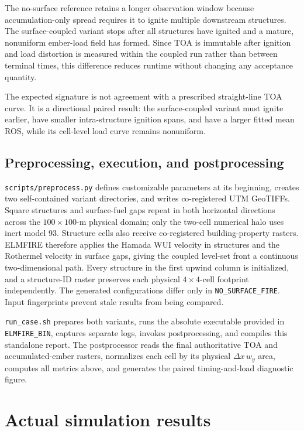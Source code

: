 The no-surface reference retains a longer observation window because
accumulation-only spread requires it to ignite multiple downstream structures.
The surface-coupled variant stops
after all structures have ignited and a mature, nonuniform ember-load field
has formed. Since TOA is immutable after ignition and load distortion is
measured within the coupled run rather than between terminal times, this
difference reduces runtime without changing any acceptance quantity.

The expected signature is not agreement with a prescribed straight-line TOA
curve. It is a directional paired result: the surface-coupled variant must
ignite earlier, have
smaller intra-structure ignition spans, and have a larger fitted mean ROS,
while its cell-level load curve remains nonuniform.

\subsection{Preprocessing, execution, and postprocessing}

\texttt{scripts/preprocess.py} defines customizable parameters at its
beginning, creates two self-contained variant directories, and writes
co-registered UTM GeoTIFFs. Square structures and surface-fuel gaps repeat in
both horizontal directions across the \(100\times100\)-m physical domain; only
the two-cell numerical halo uses inert model 93. Structure cells also receive
co-registered building-property rasters.
ELMFIRE therefore applies the Hamada WUI velocity in structures and the
Rothermel velocity in surface gaps, giving the coupled level-set front a
continuous two-dimensional path. Every structure in the first upwind column is
initialized, and a structure-ID raster preserves each physical \(4\times4\)-cell
footprint independently.
The generated configurations differ only in
\texttt{NO\_SURFACE\_FIRE}. Input fingerprints prevent stale results from
being compared.

\texttt{run\_case.sh} prepares both variants, runs the absolute executable
provided in \texttt{ELMFIRE\_BIN}, captures separate logs, invokes
postprocessing, and compiles this standalone report. The postprocessor reads
the final authoritative TOA and accumulated-ember rasters, normalizes each cell
by its physical \(\Delta x\,w_y\) area, computes all metrics above, and
generates the paired timing-and-load diagnostic figure.

\section{Actual simulation results}

